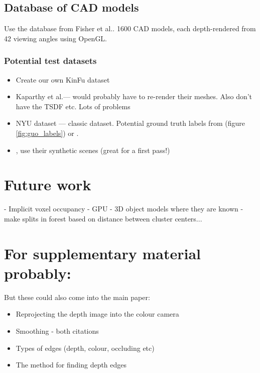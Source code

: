 \documentclass[10pt,twocolumn,letterpaper]{article}
\makeatletter
\newcommand*{\ea}{et al.\@\xspace}
\makeatother
\begin{document}
\subsection{Database of CAD models}
Use the database from Fisher \ea \cite{fisher-siggraphasia-2012}.
1600 CAD models, each depth-rendered from 42 viewing angles using OpenGL.

\subsubsection{Potential test datasets}
\begin{itemize}
\item Create our own KinFu dataset
\item Kaparthy \ea --- would probably have to re-render their meshes.
Also don't have the TSDF etc. Lots of problems
\item NYU dataset --- classic dataset. Potential ground truth labels from \cite{guo-iccv-2013} (figure \ref{fig:guo_labels}) or \cite{kim-iccv-2013}.
\item \cite{fisher-siggraphasia-2012}, use their synthetic scenes (great for a first pass!)
\end{itemize}


\section{Future work}

- Implicit voxel occupancy
- GPU
- 3D object models where they are known
- make splits in forest based on distance between cluster centers...  

\section{For supplementary material probably:}
But these could also come into the main paper:
\begin{itemize}
\item Reprojecting the depth image into the colour camera
\item Smoothing - both citations
\item Types of edges (depth, colour, occluding etc)
\item The method for finding depth edges
\end{itemize}



{\small


}

\end{document}

